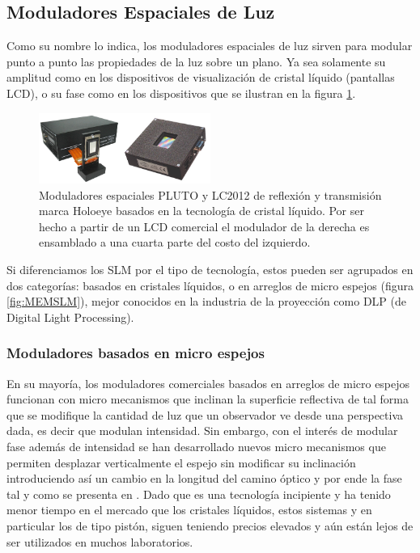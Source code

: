 \subsection{Moduladores Espaciales de Luz}

Como su nombre lo indica, los moduladores espaciales de luz sirven
para modular punto a punto las propiedades de la luz sobre un
plano. Ya sea solamente su amplitud como en los dispositivos de
visualización de cristal líquido (pantallas LCD), o su fase como en
los dispositivos que se ilustran en la figura \ref{fig:LCDSLM}.
\begin{figure}[h!]
\centering
    \includegraphics[width=0.5\textwidth]{LCDSLM.png}
\caption{Moduladores espaciales PLUTO y LC2012 de reflexión y
  transmisión marca Holoeye basados en la tecnología de cristal
  líquido. Por ser hecho a partir de un LCD comercial el modulador de
  la derecha es ensamblado a una cuarta parte del costo del izquierdo.}
\label{fig:LCDSLM}
\end{figure}

Si diferenciamos los SLM por el tipo de tecnología, estos pueden ser
agrupados en dos categorías: basados en cristales líquidos, o en
arreglos de micro espejos (figura \ref{fig:MEMSLM}), mejor 
conocidos en la industria de la proyección como DLP (de Digital Light
Processing).  
\subsubsection{Moduladores basados en micro espejos}
En su mayoría, los moduladores comerciales basados en arreglos de micro
espejos funcionan con micro mecanismos que inclinan la superficie
reflectiva de tal forma que se modifique la cantidad de luz que un
observador ve desde una perspectiva dada, es decir que modulan
intensidad. Sin embargo, con el interés de modular fase además de
intensidad se han desarrollado nuevos micro mecanismos que
permiten desplazar verticalmente el espejo sin modificar su
inclinación introduciendo así un cambio en la longitud del camino
óptico y por ende la fase tal y como se presenta en . Dado que es una tecnología incipiente y ha tenido
menor tiempo en el mercado que los cristales líquidos, estos sistemas
y en particular los de tipo pistón, siguen teniendo precios elevados y
aún están lejos de ser utilizados en muchos laboratorios.

